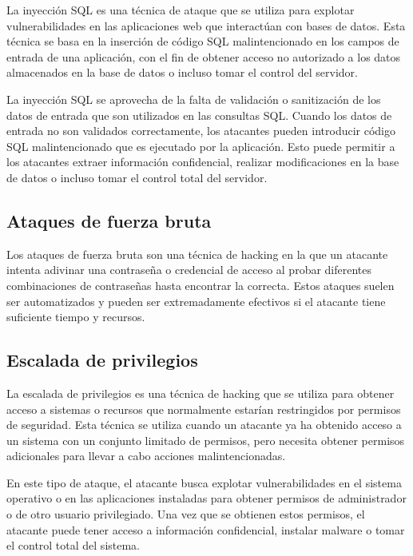             La inyección SQL es una técnica de ataque que se utiliza para explotar vulnerabilidades en las aplicaciones web que interactúan con bases de datos. Esta técnica se basa en la inserción de código SQL malintencionado en los campos de entrada de una aplicación, con el fin de obtener acceso no autorizado a los datos almacenados en la base de datos o incluso tomar el control del servidor.
            
            La inyección SQL se aprovecha de la falta de validación o sanitización de los datos de entrada que son utilizados en las consultas SQL. Cuando los datos de entrada no son validados correctamente, los atacantes pueden introducir código SQL malintencionado que es ejecutado por la aplicación. Esto puede permitir a los atacantes extraer información confidencial, realizar modificaciones en la base de datos o incluso tomar el control total del servidor.
        
        
        \subsection{Ataques de fuerza bruta}
            
            Los ataques de fuerza bruta son una técnica de hacking en la que un atacante intenta adivinar una contraseña o credencial de acceso al probar diferentes combinaciones de contraseñas hasta encontrar la correcta. Estos ataques suelen ser automatizados y pueden ser extremadamente efectivos si el atacante tiene suficiente tiempo y recursos.
        
        
        \subsection{Escalada de privilegios}
            
            La escalada de privilegios es una técnica de hacking que se utiliza para obtener acceso a sistemas o recursos que normalmente estarían restringidos por permisos de seguridad. Esta técnica se utiliza cuando un atacante ya ha obtenido acceso a un sistema con un conjunto limitado de permisos, pero necesita obtener permisos adicionales para llevar a cabo acciones malintencionadas.
            
            En este tipo de ataque, el atacante busca explotar vulnerabilidades en el sistema operativo o en las aplicaciones instaladas para obtener permisos de administrador o de otro usuario privilegiado. Una vez que se obtienen estos permisos, el atacante puede tener acceso a información confidencial, instalar malware o tomar el control total del sistema.
        

